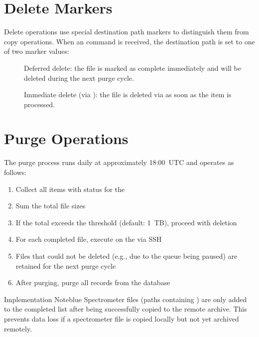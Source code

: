 \section{Delete Markers}

Delete operations use special destination path markers to distinguish them from copy operations. When an  command is received, the destination path is set to one of two marker values:

\begin{description}
    \item[] Deferred delete: the file is marked as complete immediately and will be deleted during the next purge cycle.
    \item[] Immediate delete (via ): the file is deleted via  as soon as the item is processed.
\end{description}

\section{Purge Operations}

The purge process runs daily at approximately 18:00~UTC and operates as follows:

\begin{enumerate}
    \item Collect all items with status  for the \DR{}
    \item Sum the total file sizes
    \item If the total exceeds the  threshold (default: 1~TB), proceed with deletion
    \item For each completed file, execute  on the \DR{} via SSH
    \item Files that could not be deleted (e.g., due to the queue being paused) are retained for the next purge cycle
    \item After purging, purge all  records from the database
\end{enumerate}

\begin{calloutBox}{Implementation Note}{blue}
Spectrometer files (paths containing ) are only added to the completed list after being successfully copied to the remote archive. This prevents data loss if a spectrometer file is copied locally but not yet archived remotely.
\end{calloutBox}
